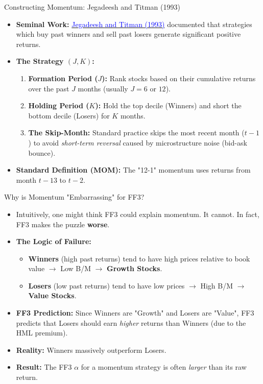 \documentclass{beamer}
\begin{document}
\begin{frame}{Constructing Momentum: Jegadeesh and Titman (1993)}
	\begin{itemize}
		\item \textbf{Seminal Work:} \href{https://doi.org/10.1111/j.1540-6261.1993.tb04702.x}{\textcolor{blue}{Jegadeesh and Titman (1993)}} documented that strategies which buy past winners and sell past losers generate significant positive returns.
		\item \textbf{The Strategy $(J, K)$:}
		\begin{enumerate}
			\item \textbf{Formation Period ($J$):} Rank stocks based on their cumulative returns over the past $J$ months (usually $J=6$ or $12$).
			\item \textbf{Holding Period ($K$):} Hold the top decile (Winners) and short the bottom decile (Losers) for $K$ months.
			\item \textbf{The Skip-Month:} Standard practice skips the most recent month ($t-1$) to avoid \textit{short-term reversal} caused by microstructure noise (bid-ask bounce).
		\end{enumerate}
		\item \textbf{Standard Definition (MOM):} The "12-1" momentum uses returns from month $t-13$ to $t-2$.
	\end{itemize}
\end{frame}

\begin{frame}{Why is Momentum "Embarrassing" for FF3?}
	\begin{itemize}
		\item Intuitively, one might think FF3 could explain momentum. It cannot. In fact, FF3 makes the puzzle \textbf{worse}.
		\item \textbf{The Logic of Failure:}
		\begin{itemize}
			\item \textbf{Winners} (high past returns) tend to have high prices relative to book value $\rightarrow$ Low B/M $\rightarrow$ \textbf{Growth Stocks}.
			\item \textbf{Losers} (low past returns) tend to have low prices $\rightarrow$ High B/M $\rightarrow$ \textbf{Value Stocks}.
		\end{itemize}
		\item \textbf{FF3 Prediction:} Since Winners are "Growth" and Losers are "Value", FF3 predicts that Losers should earn \textit{higher} returns than Winners (due to the HML premium).
		\item \textbf{Reality:} Winners massively outperform Losers.
		\item \textbf{Result:} The FF3 $\alpha$ for a momentum strategy is often \textit{larger} than its raw return.
	\end{itemize}
\end{frame}
\end{document}

